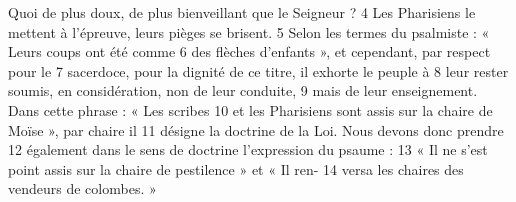 Quoi de plus doux, de plus bienveillant que le Seigneur ?	 
4	 	Les Pharisiens le mettent à l'épreuve, leurs pièges se brisent.	 
5	 	Selon les termes du psalmiste : « Leurs coups ont été comme	 
6	 	des flèches d'enfants », et cependant, par respect pour le	 
7	 	sacerdoce, pour la dignité de ce titre, il exhorte le peuple à	 
8	 	leur rester soumis, en considération, non de leur conduite,	 
9	 	mais de leur enseignement. Dans cette phrase : « Les scribes	 
10	 	et les Pharisiens sont assis sur la chaire de Moïse », par chaire il	 
11	 	désigne la doctrine de la Loi. Nous devons donc prendre	 
12	 	également dans le sens de doctrine l'expression du psaume :	 
13	 	« Il ne s'est point assis sur la chaire de pestilence » et « Il ren-	 
14	 	versa les chaires des vendeurs de colombes. »